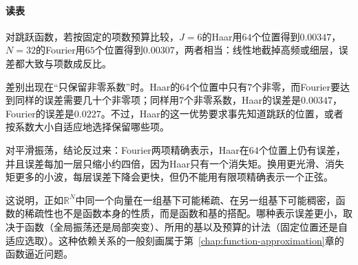 \paragraph{读表}
对跳跃函数，若按固定的项数预算比较，$J=6$的Haar用$64$个位置得到$0.00347$，$N=32$的Fourier用$65$个位置得到$0.00307$，两者相当：线性地截掉高频或细层，误差都大致与项数成反比。

差别出现在“只保留非零系数”时。Haar的$64$个位置中只有$7$个非零，而Fourier要达到同样的误差需要几十个非零项；同样用$7$个非零系数，Haar的误差是$0.00347$，Fourier的误差是$0.0227$。不过，Haar的这一优势要求事先知道跳跃的位置，或者按系数大小自适应地选择保留哪些项。

对平滑振荡，结论反过来：Fourier两项精确表示，Haar在$64$个位置上仍有误差，并且误差每加一层只缩小约四倍，因为Haar只有一个消失矩。换用更光滑、消失矩更多的小波，每层误差下降会更快，但仍不能用有限项精确表示一个正弦。

这说明，正如$\mathbb R^N$中同一个向量在一组基下可能稀疏、在另一组基下可能稠密，函数的稀疏性也不是函数本身的性质，而是函数和基的搭配。哪种表示误差更小，取决于函数（全局振荡还是局部突变）、所用的基以及预算的计法（固定位置还是自适应选取）。这种依赖关系的一般刻画属于第~\ref{chap:function-approximation}章的函数逼近问题。
